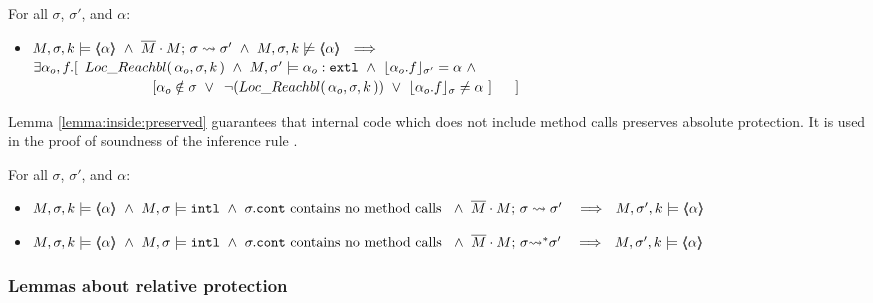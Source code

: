   
 
   {
 \begin{lemma} For all $\sigma$, $\sigma'$, and $\alpha$:
 \label{lemma:notInside:implies}
\begin{itemize}
\item
$ \satDAssertFrom M  {\sigma} k   {\inside{\alpha}}  \ \wedge \ \leadstoBounded  {\Mtwo\cdot M}  {\sigma}  {\sigma'}\ \wedge \  \notSatDAssertFrom M  {\sigma} k   {\inside{\alpha}}
 \ \ \Longrightarrow\ \ $\\
 $\exists \alpha_o,f.[\  \LRelevantK {\alpha_o} {\sigma} {k} \ \wedge \ M, \sigma' \models \external {\alpha_o} \ \wedge \ \interpret {\sigma'} {\alpha_o.f} = \alpha\  \wedge$\\
$\strut \hspace{3cm} [ \alpha_o \notin \sigma\ \vee\ \NotLRelevantK {\alpha_o} {\sigma} {k}\ \vee\  \interpret {\sigma} {\alpha_o.f} \neq \alpha\ ]\ \ \ \ \ ] $
\end{itemize}
\end{lemma}
}

Lemma \ref{lemma:inside:preserved}  guarantees that internal code which does not include method calls preserves absolute protection. 
It is used in the proof of soundness of the inference rule {}.

  {
 \begin{lemma} For all $\sigma$, $\sigma'$, and $\alpha$:
 \label{lemma:inside:preserved} 
\begin{itemize}
\item
$ \satDAssertFrom M  {\sigma} k   {\inside{\alpha}}  \ \wedge \ M, \sigma \models \intThis \ \wedge \ \sigma.\prg{cont} \mbox{ contains no method calls } \ \wedge\ \leadstoBounded   {\Mtwo\cdot M}  {\sigma}  {\sigma'}\  \ \ \Longrightarrow\ \ \satDAssertFrom M  {\sigma'} k   {\inside{\alpha}}$
\item
$ \satDAssertFrom M  {\sigma} k   {\inside{\alpha}}  \ \wedge \ M, \sigma \models \intThis \ \wedge \ \sigma.\prg{cont}  \mbox{ contains no method calls } \ \wedge\ \leadstoBoundedStar  {\Mtwo\cdot M}  {\sigma}  {\sigma'}\  \ \ \Longrightarrow\ \ \satDAssertFrom M  {\sigma'} k   {\inside{\alpha}}$
\end{itemize}
\end{lemma}
}

\subsubsection{Lemmas about relative protection}



